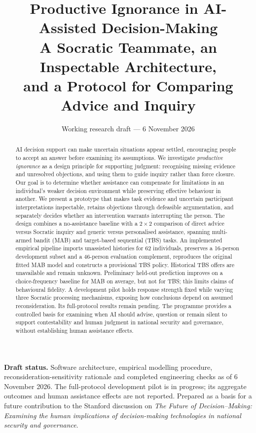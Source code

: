 \documentclass[11pt,a4paper]{article}
\title{\textbf{Productive Ignorance in AI-Assisted Decision-Making}\\[4pt]
  \large A Socratic Teammate, an Inspectable Architecture,\\
  and a Protocol for Comparing Advice and Inquiry}
\author{}
\date{Working research draft --- 6 November 2026}
\begin{document}
\maketitle
\vspace{-1.5em}
\begin{abstract}
AI decision support can make uncertain situations appear settled, encouraging people to accept an answer before examining its assumptions. We investigate \emph{productive ignorance} as a design principle for supporting judgment: recognising missing evidence and unresolved objections, and using them to guide inquiry rather than force closure. Our goal is to determine whether assistance can compensate for limitations in an individual's weaker decision environment while preserving effective behaviour in another. We present a prototype that makes task evidence and uncertain participant interpretations inspectable, retains objections through defeasible argumentation, and separately decides whether an intervention warrants interrupting the person. The design combines a no-assistance baseline with a $2\times2$ comparison of direct advice versus Socratic inquiry and generic versus personalised assistance, spanning multi-armed bandit (MAB) and target-based sequential (TBS) tasks. An implemented empirical pipeline imports unassisted histories for 62 individuals, preserves a 16-person development subset and a 46-person evaluation complement, reproduces the original fitted MAB model and constructs a provisional TBS policy. Historical TBS offers are unavailable and remain unknown. Preliminary held-out prediction improves on a choice-frequency baseline for MAB on average, but not for TBS; this limits claims of behavioural fidelity. A development pilot holds response strength fixed while varying three Socratic processing mechanisms, exposing how conclusions depend on assumed reconsideration. Its full-protocol results remain pending. The programme provides a controlled basis for examining when AI should advise, question or remain silent to support contestability and human judgment in national security and governance, without establishing human assistance effects.
\end{abstract}

\begin{center}
\small\textbf{Draft status.} Software architecture, empirical modelling procedure, reconsideration-sensitivity rationale and completed engineering checks as of 6 November 2026. The full-protocol development pilot is in progress; its aggregate outcomes and human assistance effects are not reported. Prepared as a basis for a future contribution to the Stanford discussion on \emph{The Future of Decision--Making: Examining the human implications of decision-making technologies in national security and governance}.
\end{center}
\end{document}

